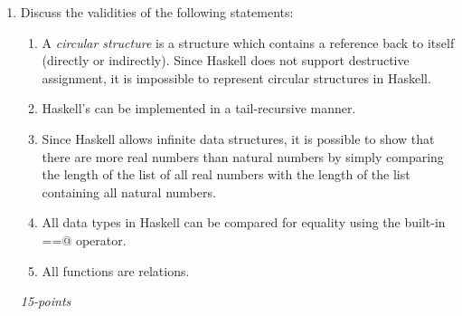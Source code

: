 \documentclass[12pt]{article}
\begin{document}
\begin{enumerate}
\item Discuss the validities of the following statements:

  \begin{enumerate}

    \item A \textit{circular structure} is a structure which contains a
    reference back to itself (directly or indirectly).  Since Haskell
    does not support destructive assignment, it is impossible to
    represent circular structures in Haskell.

  \item Haskell's \verb@foldl@ can be implemented in a tail-recursive
    manner.

  \item Since Haskell allows infinite data structures, it is possible
    to show that there are more real numbers than natural numbers by
    simply comparing the length of the list of all real numbers with
    the length of the list containing all natural numbers.


  \item All data types in Haskell can be compared for equality using
    the built-in \verb@==@ operator.

  \item All functions are relations.

  \end{enumerate} \hfill\textit{15-points}
  

\end{enumerate}
\end{document}
